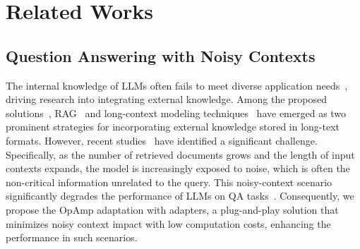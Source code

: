 \section{Related Works}

\subsection{Question Answering with Noisy Contexts}
The internal knowledge of LLMs often fails to meet diverse application needs~\cite{he2022retrieval, Ji2023Survey}, driving research into integrating external knowledge. 
Among the proposed solutions~\cite{guu2020realm, beltagy2020longformer, wang2024knowledgeediting}, RAG~\cite{borgeaud2022retrieving, ren2024knowledgeboundary} and long-context modeling techniques~\cite{press2022trainshorttestlong, chen2023extendingcontextwindow} have emerged as two prominent strategies for incorporating external knowledge stored in long-text formats. 
However, recent studies~\cite{Shi2023distracted, liu2024lost, lv2024coarse, ye2025difftrans} have identified a significant challenge. 
Specifically, as the number of retrieved documents grows and the length of input contexts expands, the model is increasingly exposed to noise, which is often the non-critical information unrelated to the query.
This noisy-context scenario significantly degrades the performance of LLMs on QA tasks~\cite{chen2023benchmark}. 
Consequently, we propose the OpAmp adaptation with adapters, a plug-and-play solution that minimizes noisy context impact with low computation costs, enhancing the performance in such scenarios.

